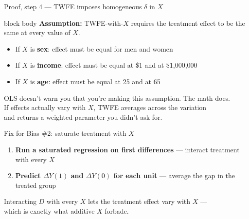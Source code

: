 \documentclass[aspectratio=169,11pt]{beamer}
\newcommand{\emphbox}[1]{%
  \begin{beamercolorbox}[rounded=true,sep=7pt,wd=\linewidth]{block body}%
    \small\color{slate} #1%
  \end{beamercolorbox}}
\begin{document}
\begin{frame}{Proof, step 4 --- TWFE imposes homogeneous $\delta$ in $X$}
\vspace{0.3em}
\emphbox{\textbf{Assumption:} TWFE-with-$X$ requires the treatment effect to be the same
at every value of $X$.}
\vspace{0.5em}
\begin{itemize}\setlength\itemsep{0.5em}
  \item If $X$ is \textbf{sex}: effect must be equal for men and women
  \item If $X$ is \textbf{income}: effect must be equal at \$1 and at \$1{,}000{,}000
  \item If $X$ is \textbf{age}: effect must be equal at 25 and at 65
\end{itemize}
\vspace{0.5em}
\begin{center}\color{warmgray}\small
OLS doesn't warn you that you're making this assumption. The math does.\\
If effects actually vary with $X$, TWFE averages across the variation\\
and returns a weighted parameter you didn't ask for.
\end{center}
\end{frame}

\begin{frame}[fragile]{Fix for Bias \#2: saturate treatment with $X$}
\vspace{0.2em}
\begin{enumerate}\setlength\itemsep{0.4em}\small
  \item \textbf{Run a saturated regression on first differences} --- interact treatment with every $X$
  \item \textbf{Predict $\Delta Y(1)$ and $\Delta Y(0)$ for each unit} --- average the gap in the treated group
\end{enumerate}
\vspace{1em}
\begin{center}\color{warmgray}
Interacting $D$ with every $X$ lets the treatment effect vary with $X$ --- \\ which is exactly what additive $X$ forbade.
\end{center}
\end{frame}
\end{document}
